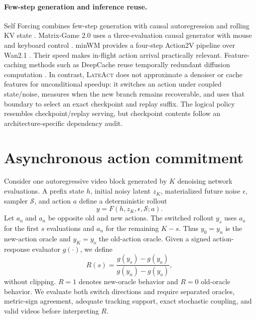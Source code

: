 \documentclass{article}
\newcommand{\method}{\textsc{LateAct}}
\begin{document}
\paragraph{Few-step generation and inference reuse.}
Self Forcing combines few-step generation with causal autoregression and
rolling KV state \citep{huang2025selfforcing}. Matrix-Game 2.0 uses a
three-evaluation causal generator with mouse and keyboard control
\citep{he2025matrixgame2}. minWM provides a four-step Action2V pipeline over
Wan2.1 \citep{zhao2026minwm,wan2025}. Their speed makes in-flight action
arrival practically relevant. Feature-caching methods such as DeepCache reuse
temporally redundant diffusion computation \citep{ma2024deepcache}. In
contrast, \method{} does not approximate a denoiser or cache features for
unconditional speedup: it switches an action under coupled state/noise,
measures when the new branch remains recoverable, and uses that boundary to
select an exact checkpoint and replay suffix. The logical policy resembles
checkpoint/replay serving, but checkpoint contents follow an
architecture-specific dependency audit.

\section{Asynchronous action commitment}
\label{sec:problem}

Consider one autoregressive video block generated by $K$ denoising network
evaluations. A prefix state $h$, initial noisy latent $z_K$, materialized future
noise $\epsilon$, sampler $\mathcal{S}$, and action $a$ define a deterministic
rollout
\begin{equation}
  y = F(h,z_K,\epsilon,\mathcal{S};a).
\end{equation}
Let $a_o$ and $a_n$ be opposite old and new actions. The switched rollout
$y_s$ uses $a_o$ for the first $s$ evaluations and $a_n$ for the remaining
$K-s$. Thus $y_0=y_n$ is the new-action oracle and $y_K=y_o$ the old-action
oracle. Given a signed action-response evaluator $g(\cdot)$, we define
\begin{equation}
  R(s)=
  \frac{g(y_s)-g(y_o)}{g(y_n)-g(y_o)} ,
  \label{eq:response}
\end{equation}
without clipping. $R=1$ denotes new-oracle behavior and $R=0$ old-oracle
behavior. We evaluate both switch directions and require separated oracles,
metric-sign agreement, adequate tracking support, exact stochastic coupling,
and valid videos before interpreting $R$.
\end{document}
